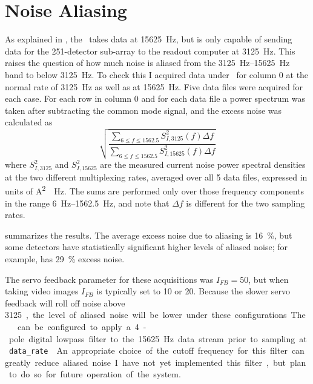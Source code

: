 \section{Noise Aliasing} \label{sec:ch6-aliasing}

As explained in , the \MCE\ takes data at \SI{15625}{\hertz}, but is only capable of sending data for the 251-detector sub-array to the readout computer at \SI{3125}{\hertz}.
This raises the question of how much noise is aliased from the \SIrange{3125}{15625}{\hertz} band to below \SI{3125}{\hertz}.
To check this I acquired data under \SOC\ for column 0 at the normal rate of \SI{3125}{\hertz} as well as at \SI{15625}{\hertz}.
Five data files were acquired for each case.
For each row in column 0 and for each data file a power spectrum was taken after subtracting the common mode signal, and the excess noise was calculated as
\begin{equation}
  \sqrt{  \frac{ {\displaystyle \sum_{6 \le f \le 1562.5}} S^2_{I,3125}(f) \Delta f }
               { {\displaystyle \sum_{6 \le f \le 1562.5}} S^2_{I,15625}(f) \Delta f }}
\end{equation}
where $S^2_{I,3125}$ and $S^2_{I,15625}$ are the measured current noise power spectral densities at the two different multiplexing rates, averaged over all 5 data files, expressed in units of \si{\A^2 \per \Hz}.
The sums are performed only over those frequency components in the range \SIrange{6}{1562.5}{\Hz}, and note that $\Delta f$ is different for the two sampling rates.

 summarizes the results.
The average excess noise due to aliasing is \SI{16}{\percent}, but some detectors have statistically significant higher levels of aliased noise; for example,  has \SI{29}{\percent} excess noise.

The servo feedback parameter for these acquisitions was $I_{FB} = 50$, but when taking video images $I_{FB}$ is typically set to 10 or 20.
Because the slower servo feedback will roll off noise above \SI{3125}, the level of aliased noise will be lower under these configurations.

The \MCE\ can be configured to apply a 4-pole digital lowpass filter to the \SI{15625}{\Hz} data stream prior to sampling at \texttt{data\_rate} \cite{mce_team_digital_????}.
An appropriate choice of the cutoff frequency for this filter can greatly reduce aliased noise.
I have not yet implemented this filter, but plan to do so for future operation of the system.

